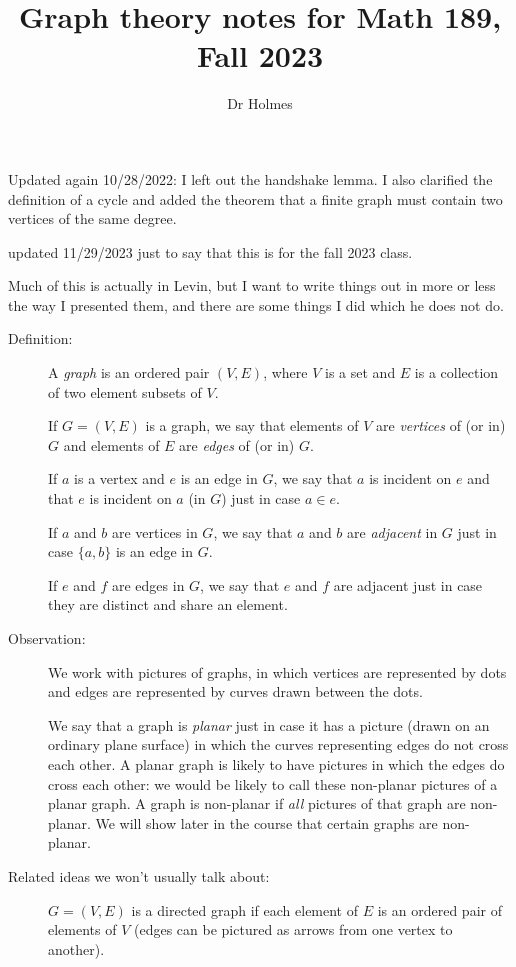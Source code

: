 \documentclass[12pt]{article}
\title{Graph theory notes for Math 189, Fall 2023}
\author{Dr Holmes}
\begin{document}
\maketitle

Updated again 10/28/2022:  I left out the handshake lemma.  I also clarified the definition of a cycle and added the theorem that a finite graph must contain two vertices of the same degree.

updated 11/29/2023 just to say that this is for the fall 2023 class.

Much of this is actually in Levin, but I want to write things out in more or less the way I presented them, and there are some things I did which he does not do.

\begin{description}

\item[Definition:]   A {\em graph\/} is an ordered pair $(V,E)$, where $V$ is a set and $E$ is a collection of two element subsets of $V$.

If $G=(V,E)$ is a graph, we say that elements of $V$ are {\em vertices\/} of (or in) $G$ and elements of $E$ are {\em edges\/} of (or in) $G$.

If $a$ is a vertex and $e$ is an edge in $G$, we say that $a$ is incident on $e$ and that $e$ is incident on $a$ (in $G$) just in case $a \in e$.

If $a$ and $b$ are vertices in $G$, we say that $a$ and $b$ are {\em adjacent\/} in $G$ just in case $\{a,b\}$ is an edge in $G$.

If $e$ and $f$ are edges in $G$, we say that $e$ and $f$ are adjacent just in case they are distinct and share an element.

\item[Observation:]  We work with pictures of graphs, in which vertices are represented by dots and edges are represented by curves drawn between the dots.

We say that a graph is {\em planar\/} just in case it has a picture (drawn on an ordinary plane surface) in which the curves representing edges do not cross each other.  A planar graph is likely to have pictures in which the edges do cross each other:  we would be likely to call these non-planar pictures of a planar graph.  A graph is non-planar if {\em all\/} pictures of that graph are non-planar.  We will show later in the course that certain graphs are non-planar.

\item[Related ideas we won't usually talk about:]  $G=(V,E)$ is a directed graph if each element of $E$ is an ordered pair of elements of $V$ (edges can be pictured as arrows from one vertex to another).


\end{description}
\end{document}
